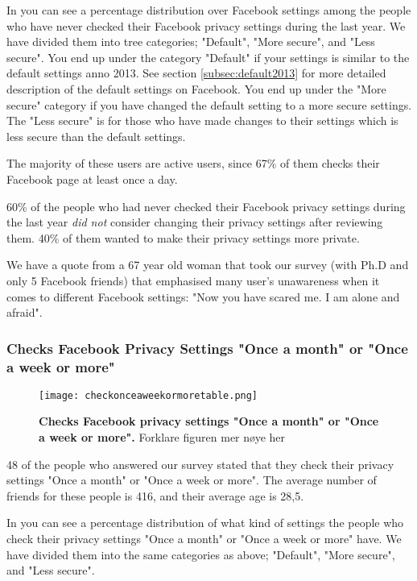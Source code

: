 In  you can see a percentage distribution over Facebook settings among the people who have never checked their Facebook privacy settings during the last year. We have divided them into tree categories; "Default", "More secure", and "Less secure". You end up under the category "Default" if your settings is similar to the default settings anno 2013. See section \ref{subsec:default2013} for more detailed description of the default settings on Facebook. You end up under the "More secure" category if you have changed the default setting to a more secure settings. The "Less secure" is for those who have made changes to their settings which is less secure than the default settings. 

The majority of these users are active users, since 67\% of them checks their Facebook page at least once a day. 

60\% of the people who had never checked their Facebook privacy settings during the last year \textit{did not} consider changing their privacy settings after reviewing them. 40\% of them wanted to make their privacy settings more private. 

We have a quote from a 67 year old woman that took our survey (with Ph.D and only 5 Facebook friends) that emphasised many user's unawareness when it comes to different Facebook settings: "Now you have scared me. I am alone and afraid".


\subsubsection{Checks Facebook Privacy Settings "Once a month" or "Once a week or more"}

\begin{figure}[h!]
\centering
\texttt{[image: checkonceaweekormoretable.png]}
\caption[Checks Facebook privacy settings "Once a month" or "Once a week or more"]{\textbf{Checks Facebook privacy settings "Once a month" or "Once a week or more".} Forklare figuren mer nøye her} 
\label{fig:onceaweekormore}
\end{figure}

48 of the people who answered our survey stated that they check their privacy settings "Once a month" or "Once a week or more". The average number of friends for these people is 416, and their average age is 28,5. 

In  you can see a percentage distribution of what kind of settings the people who check their privacy settings "Once a month" or "Once a week or more" have. We have divided them into the same categories as above; "Default", "More secure", and "Less secure".  

